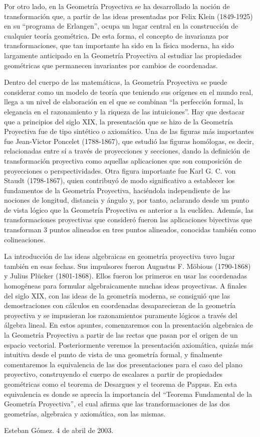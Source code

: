 Por otro lado, en la Geometría Proyectiva se ha desarrollado la noción de transformación que, a partir de las ideas presentadas por Felix Klein (1849-1925) en su “programa
de Erlangen”, ocupa un lugar central en la construcción de cualquier teoría geométrica.
De esta forma, el concepto de invarianza por transformaciones, que tan importante ha 
sido en la física moderna, ha sido largamente anticipado en la Geometría Proyectiva
al estudiar las propiedades geométricas que permanecen invariantes por cambios de
coordenadas.

Dentro del cuerpo de las matemáticas, la Geometría Proyectiva se puede considerar
como un modelo de teoría que teniendo sus orígenes en el mundo real, llega a un
nivel de elaboración en el que se combinan “la perfección formal, la elegancia en el
razonamiento y la riqueza de las intuiciones”.
Hay que destacar que a principios del siglo XIX, la presentación que se hizo de la
Geometría Proyectiva fue de tipo sintético o axiomático. Una de las figuras más importantes fue Jean-Victor Poncelet (1788-1867), que estudió las figuras homólogas, es decir,
relacionadas entre sí a través de proyecciones y secciones, dando la definición de transformación proyectiva como aquellas aplicaciones que son composición de proyecciones
o perspectividades. Otra figura importante fue Karl G. C. von Staudt (1798-1867),
quien contribuyó de modo significativo a establecer los fundamentos de la Geometría
Proyectiva, haciéndola independiente de las nociones de longitud, distancia y ángulo
y, por tanto, aclarando desde un punto de vista lógico que la Geometría Proyectiva es
anterior a la euclídea. Además, las transformaciones proyectivas que consideró fueron
las aplicaciones biyectivas que transforman 3 puntos alineados en tres puntos alineados,
conocidas también como colineaciones.

La introducción de las ideas algebraicas en geometría proyectiva tuvo lugar también en esas fechas. Sus impulsores fueron Augustus F. Möbious (1790-1868) y Julius Plücker (1801-1868). Ellos fueron los primeros en usar las coordenadas homogéneas para formular algebraicamente muchas ideas proyectivas. A finales del siglo XIX, con
las ideas de la geometría moderna, se consiguió que las demostraciones con cálculos en coordenadas desaparecieran de la geometría proyectiva y se impusieran los razonamientos puramente lógicos a través del álgebra lineal. En estos apuntes, comenzaremos con la presentación algebraica de la Geometría Proyectiva a partir de las rectas que pasan por el origen de un espacio vectorial. Posteriormente veremos la presentación axiomática, quizás más intuitiva desde el punto de vista de una geometría formal, y finalmente comentaremos la equivalencia de las dos presentaciones para el caso del plano proyectivo, construyendo el cuerpo de escalares a partir de propiedades geométricas como el teorema de Desargues y el teorema de Pappus. En esta equivalencia es donde se aprecia la importancia del “Teorema Fundamental de la Geometría Proyectiva”, el cual afirma que las transformaciones de las dos geometrías, algebraica y axiomática, son las mismas.

\hfill Esteban Gómez. 4 de abril de 2003.